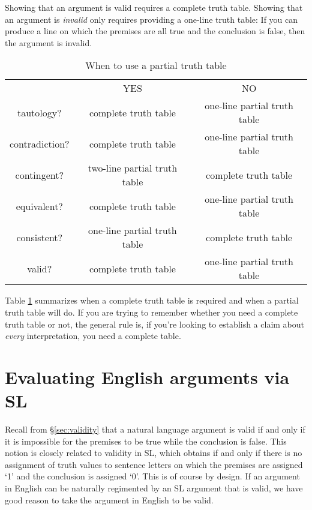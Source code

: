 Showing that an argument is valid requires a complete truth table. Showing that an argument is \emph{invalid} only requires providing a one-line truth table: If you can produce a line on which the premises are all true and the conclusion is false, then the argument is invalid.

\begin{table}[ht]
\begin{center}
\begin{tabular}{c|c|c|}
\cline{2-3}
 & YES & NO\\
\cline{2-3}
tautology? & complete truth table & one-line partial truth table\\
contradiction? &  complete truth table  & one-line partial truth table\\
contingent? & two-line partial truth table & complete truth table\\
equivalent? & complete truth table & one-line partial truth table\\
consistent? & one-line partial truth table & complete truth table\\
valid? & complete truth table & one-line partial truth table\\
\cline{2-3}
\end{tabular}
\end{center}
\caption{When to use a partial truth table}
\label{table.CompleteVsPartial}
\end{table}

Table \ref{table.CompleteVsPartial} summarizes when a complete truth table is required and when a partial truth table will do. If you are trying to remember whether you need a complete truth table or not, the general rule is, if you're looking to establish a claim about \emph{every} interpretation, you need a complete table.




\section{Evaluating English arguments via SL}
  \label{sec:forms}

Recall from \S\ref{sec:validity} that a natural language argument is valid if and only if it is impossible for the premises to be true while the conclusion is false.
This notion is closely related to validity in SL, which obtains if and only if there is no assignment of truth values to sentence letters on which the premises are assigned `1' and the conclusion is assigned `0'.
This is of course by design.
If an argument in English can be naturally regimented by an SL argument that is valid, we have good reason to take the argument in English to be valid.

